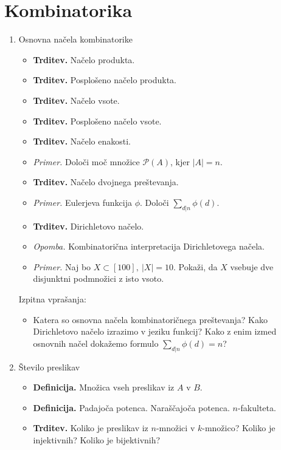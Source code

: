\section{Kombinatorika}

\begin{enumerate}
    \item Osnovna načela kombinatorike
    \begin{itemize}
        \item \colorbox{blue!30}{\textbf{Trditev.}} Načelo produkta.
        \item \colorbox{blue!30}{\textbf{Trditev.}} Posplošeno načelo produkta.
        \item \colorbox{blue!30}{\textbf{Trditev.}} Načelo vsote.
        \item \colorbox{blue!30}{\textbf{Trditev.}} Posplošeno načelo vsote.
        \item \colorbox{blue!30}{\textbf{Trditev.}} Načelo enakosti.
        \item \colorbox{yellow!30}{\emph{Primer.}} Določi moč množice \(\mathcal{P}(A)\), kjer \(|A| = n\).
        \item \colorbox{blue!30}{\textbf{Trditev.}} Načelo dvojnega preštevanja.
        \item \colorbox{yellow!30}{\emph{Primer.}} Eulerjeva funkcija \(\phi\). Določi $\sum_{d | n} \phi(d)$.
        \item \colorbox{blue!30}{\textbf{Trditev.}} Dirichletovo načelo.
        \item \colorbox{yellow!30}{\emph{Opomba.}}  Kombinatorična interpretacija Dirichletovega načela.
        \item \colorbox{yellow!30}{\emph{Primer.}} Naj bo $X \subset [100], \ |X|=10$. Pokaži, da $X$ vsebuje dve disjunktni podmnožici z isto vsoto.
    \end{itemize}

    Izpitna vprašanja:
    \begin{itemize}
        \item Katera so osnovna načela kombinatoričnega preštevanja? Kako Dirichletovo načelo izrazimo v jeziku funkcij? Kako z enim izmed osnovnih načel dokažemo formulo $\sum_{d | n} \phi(d) = n$?
    \end{itemize}

    \item Število preslikav
    \begin{itemize}
        \item \colorbox{purple!30}{\textbf{Definicija.}} Množica vseh preslikav iz \(A\) v \(B\).
        \item \colorbox{purple!30}{\textbf{Definicija.}} Padajoča potenca. Naraščajoča potenca. \(n\)-fakulteta.
        \item \colorbox{blue!30}{\textbf{Trditev.}}  Koliko je preslikav iz \(n\)-množici v \(k\)-množico? Koliko je injektivnih? Koliko je bijektivnih?
    \end{itemize}


\end{enumerate}
